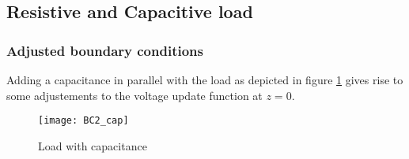 \subsection{Resistive and Capacitive load}

\subsubsection{Adjusted boundary conditions}

Adding a capacitance in parallel with the load as depicted in figure \ref{fig:Rl_Cl} gives rise to some adjustements to the voltage update function at $z=0$.

\begin{figure}
    \centering
    \texttt{[image: BC2\_cap]}
    \caption{Load with capacitance}
    \label{fig:Rl_Cl}
\end{figure}

